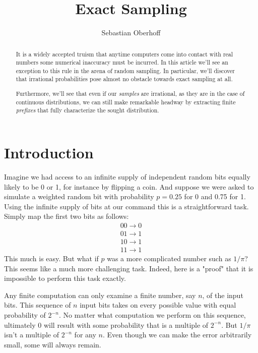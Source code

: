 \documentclass{article}
\begin{document}
\title{Exact Sampling}
\author{Sebastian Oberhoff}

\maketitle

\begin{abstract}
It is a widely accepted truism that anytime computers come into contact with real numbers some numerical inaccuracy must be incurred. In this article we'll see an exception to this rule in the arena of random sampling. In particular, we'll discover that irrational probabilities pose almost no obstacle towards exact sampling at all.

Furthermore, we'll see that even if our \textit{samples} are irrational, as they are in the case of continuous distributions, we can still make remarkable headway by extracting finite \textit{prefixes} that fully characterize the sought distribution.
\end{abstract}


\noindent
\section{Introduction}

Imagine we had access to an infinite supply of independent random bits equally likely to be 0 or 1, for instance by flipping a coin. And suppose we were asked to simulate a weighted random bit with probability $p=0.25$ for 0 and 0.75 for 1. Using the infinite supply of bits at our command this is a straightforward task. Simply map the first two bits as follows:
\[
\begin{split}
00 \rightarrow 0\\
01 \rightarrow 1\\
10 \rightarrow 1\\
11 \rightarrow 1
\end{split}
\]
This much is easy. But what if $p$ was a more complicated number such as $1/\pi$? This seems like a much more challenging task. Indeed, here is a "proof" that it is impossible to perform this task exactly.

Any finite computation can only examine a finite number, say $n$, of the input bits. This sequence of $n$ input bits takes on every possible value with equal probability of $2^{-n}$. No matter what computation we perform on this sequence, ultimately 0 will result with some probability that is a multiple of $2^{-n}$. But $1/\pi$ isn't a multiple of $2^{-n}$ for any $n$. Even though we can make the error arbitrarily small, some will always remain.
\end{document}
